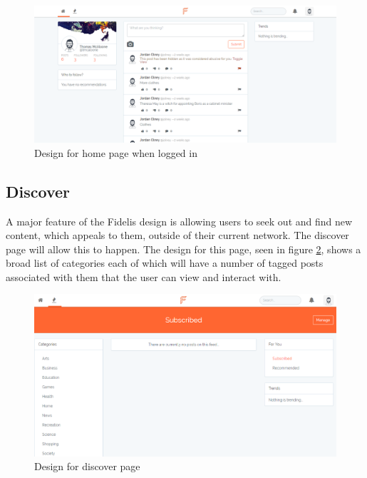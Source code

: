 \begin{figure}[H]
\centering
\includegraphics[width=\linewidth]{Images/Design/home_authorised}
\caption{Design for home page when logged in}
\label{fig:home_authorised}
\end{figure}

\subsection{Discover}
A major feature of the Fidelis design is allowing users to seek out and find new content, which appeals to them, outside of their current network. The discover page will allow this to happen. The design for this page, seen in figure \ref{fig:discover_page}, shows a broad list of categories each of which will have a number of tagged posts associated with them that the user can view and interact with.

\begin{figure}[H]
\centering
\includegraphics[width=\linewidth]{Images/Design/discover}
\caption{Design for discover page}
\label{fig:discover_page}
\end{figure}

